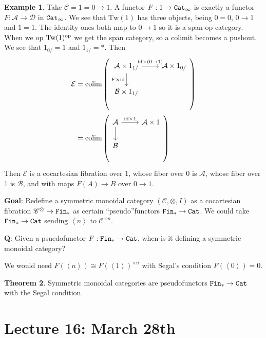 \documentclass[12pt]{amsart}
\theoremstyle{definition}
\newtheorem{theorem}{Theorem}[section]
\newtheorem{example}[theorem]{Example}
\providecommand{\Tw}{\text{Tw}}
\begin{document}
\begin{example} Take $\mathscr{C} = 1 = 0\to 1$. A functor $F:1 \to \texttt{Cat}_\infty$ is exactly a functor $F: \mathscr{A} \to \mathscr{D}$ in $\texttt{Cat}_\infty$. We see that $\Tw(1)$ has three objects, being $0 =0$, $0\to 1$ and $1=1$. The identity ones both map to $0\to 1$ so it is a span-op category. When we op $\Tw(1)^\op$ we get the span category, so a colimit becomes a pushout. We see that $1_{0/} = 1$ and $1_{1/} = \ast$. Then
\begin{align*}
    \mathcal{E} &= \colim \left(
\begin{tikzcd}[ampersand replacement=\&]
    \mathcal{A} \times 1_{1/}\rar["\id \times (0\to 1)" above]\dar["F \times\id" left] \& \mathcal{A} \times 1_{0/}\\
    \mathcal{B} \times 1_{1/} \& \\
\end{tikzcd}
    \right)
    \\
    &= \colim\left(
\begin{tikzcd}[ampersand replacement=\&]
    \mathcal{A}\rar["\id \times 1"]\dar \& \mathcal{A} \times 1\\
    \mathcal{B} \& \\
\end{tikzcd}
    \right)
\end{align*}
Then $\mathcal{E}$ is a cocartesian fibration over $1$, whose fiber over 0 is $\mathcal{A}$, whose fiber over 1 is $\mathcal{B}$, and with maps $F(A) \to B$ over $0\to 1$.
\end{example}

\textbf{Goal}: Redefine a symmetric monoidal category $\left( \mathscr{C},\otimes,I \right)$ as a cocartesian fibration $\mathscr{C}^\otimes \to \texttt{Fin}_\ast$ as certain ``pseudo''functors $\texttt{Fin}_\ast \to \texttt{Cat}$. We could take $\texttt{Fin}_\ast \to \texttt{Cat}$ sending $\left\langle n \right\rangle$ to $\mathscr{C}^{\times n}$.

\textbf{Q}: Given a psuedofunctor $F: \texttt{Fin}_\ast \to \texttt{Cat}$, when is it defining a symmetric monoidal category?

We would need $F(\left\langle n \right\rangle) \cong F(\left\langle 1 \right\rangle)^{\times n}$ with Segal's condition $F(\left\langle 0 \right\rangle) = 0$.

\begin{theorem} Symmetric monoidal categories are pseudofunctors $\texttt{Fin}_\ast \to \texttt{Cat}$ with the Segal condition.
\end{theorem}


\section{Lecture 16: March 28th}
\end{document}

